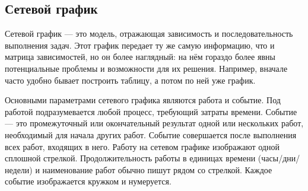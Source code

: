 \documentclass{../../text-style}
\begin{document}
\subsection{Сетевой график}

Сетевой график --- это модель, отражающая зависимость и последовательность выполнения задач. Этот график передает ту же самую информацию, что и матрица зависимостей, но он более наглядный: на нём гораздо более явны потенциальные проблемы и возможности для их решения. Например, вначале часто удобно бывает построить таблицу, а потом по ней уже график.

Основными параметрами сетевого графика являются работа и событие. Под работой подразумевается любой процесс, требующий затраты времени. Событие --- это промежуточный или окончательный результат одной или нескольких работ, необходимый для начала других работ. Событие совершается после выполнения всех работ, входящих в него. Работу на сетевом графике изображают одной сплошной стрелкой. Продолжительность работы в единицах времени (часы/дни/недели) и наименование работ обычно пишут рядом со стрелкой. Каждое событие изображается кружком и нумеруется.

\begin{center}
\end{center}
\end{document}
